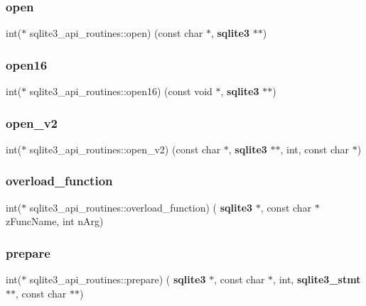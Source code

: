 \subsubsection{open}
{\footnotesize\ttfamily int($\ast$ sqlite3\+\_\+api\+\_\+routines\+::open) (const char $\ast$, \textbf{ sqlite3} $\ast$$\ast$)}

\mbox{\label{structsqlite3__api__routines_a58d3ff1185d4aae08c6be2b71c4a2e23}} 
\subsubsection{open16}
{\footnotesize\ttfamily int($\ast$ sqlite3\+\_\+api\+\_\+routines\+::open16) (const void $\ast$, \textbf{ sqlite3} $\ast$$\ast$)}

\mbox{\label{structsqlite3__api__routines_a1e6684ec7752ca3aea64da0049490083}} 
\subsubsection{open\_v2}
{\footnotesize\ttfamily int($\ast$ sqlite3\+\_\+api\+\_\+routines\+::open\+\_\+v2) (const char $\ast$, \textbf{ sqlite3} $\ast$$\ast$, int, const char $\ast$)}

\mbox{\label{structsqlite3__api__routines_a44b969d18a0986e9cef7bc8b8b35e1c2}} 
\subsubsection{overload\_function}
{\footnotesize\ttfamily int($\ast$ sqlite3\+\_\+api\+\_\+routines\+::overload\+\_\+function) (\textbf{ sqlite3} $\ast$, const char $\ast$z\+Func\+Name, int n\+Arg)}

\mbox{\label{structsqlite3__api__routines_a506ea7218da25d4973721f4770ce8dc7}} 
\subsubsection{prepare}
{\footnotesize\ttfamily int($\ast$ sqlite3\+\_\+api\+\_\+routines\+::prepare) (\textbf{ sqlite3} $\ast$, const char $\ast$, int, \textbf{ sqlite3\+\_\+stmt} $\ast$$\ast$, const char $\ast$$\ast$)}

